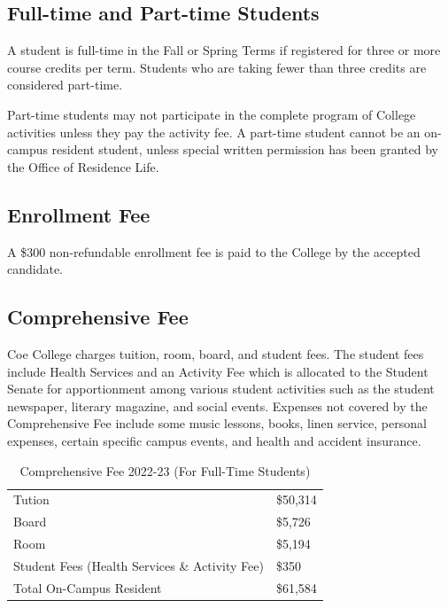 \documentclass[
  letterpaper,
]{scrbook}
\renewcommand\toprule[2]\relax
\renewcommand\bottomrule[2]\relax
\begin{document}
\subsection{Full-time and Part-time
Students}\label{full-time-and-part-time-students}

A student is full-time in the Fall or Spring Terms if registered for
three or more course credits per term. Students who are taking fewer
than three credits are considered part-time.

Part-time students may not participate in the complete program of
College activities unless they pay the activity fee. A part-time student
cannot be an on-campus resident student, unless special written
permission has been granted by the Office of Residence Life.

\subsection{Enrollment Fee}\label{enrollment-fee}

A \$300 non-refundable enrollment fee is paid to the College by the
accepted candidate.

\subsection{Comprehensive Fee}\label{comprehensive-fee}

Coe College charges tuition, room, board, and student fees. The student
fees include Health Services and an Activity Fee which is allocated to
the Student Senate for apportionment among various student activities
such as the student newspaper, literary magazine, and social events.
Expenses not covered by the Comprehensive Fee include some music
lessons, books, linen service, personal expenses, certain specific
campus events, and health and accident insurance.

\begin{longtable}[]{@{}
  >{\raggedright\arraybackslash}p{}
  >{\raggedleft\arraybackslash}p{}@{}}
\caption{Comprehensive Fee 2022-23 (For Full-Time
Students)}\tabularnewline
\toprule\noalign{}
\endfirsthead
\endhead
\bottomrule\noalign{}
\endlastfoot
Tution & \$50,314 \\
Board & \$5,726 \\
Room & \$5,194 \\
Student Fees (Health Services \& Activity Fee) & \$350 \\
Total On-Campus Resident & \$61,584 \\
\end{longtable}
\end{document}
